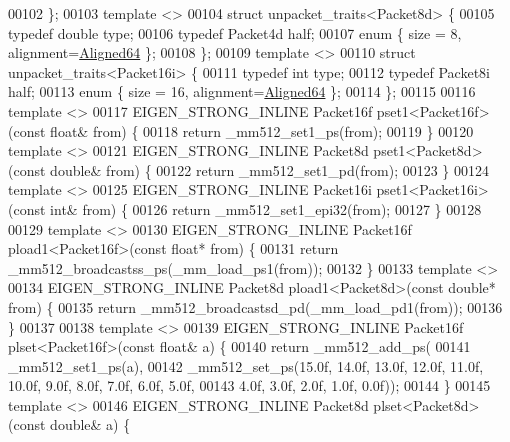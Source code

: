 \begin{DoxyCode}
00102 \};
00103 \textcolor{keyword}{template} <>
00104 \textcolor{keyword}{struct }unpacket\_traits<Packet8d> \{
00105   \textcolor{keyword}{typedef} \textcolor{keywordtype}{double} type;
00106   \textcolor{keyword}{typedef} Packet4d half;
00107   \textcolor{keyword}{enum} \{ size = 8, alignment=\hyperlink{group__enums_gga45fe06e29902b7a2773de05ba27b47a1a0f4f4451618a2e67cade6b54ca0fc84b}{Aligned64} \};
00108 \};
00109 \textcolor{keyword}{template} <>
00110 \textcolor{keyword}{struct }unpacket\_traits<Packet16i> \{
00111   \textcolor{keyword}{typedef} \textcolor{keywordtype}{int} type;
00112   \textcolor{keyword}{typedef} Packet8i half;
00113   \textcolor{keyword}{enum} \{ size = 16, alignment=\hyperlink{group__enums_gga45fe06e29902b7a2773de05ba27b47a1a0f4f4451618a2e67cade6b54ca0fc84b}{Aligned64} \};
00114 \};
00115 
00116 \textcolor{keyword}{template} <>
00117 EIGEN\_STRONG\_INLINE Packet16f pset1<Packet16f>(\textcolor{keyword}{const} \textcolor{keywordtype}{float}& from) \{
00118   \textcolor{keywordflow}{return} \_mm512\_set1\_ps(from);
00119 \}
00120 \textcolor{keyword}{template} <>
00121 EIGEN\_STRONG\_INLINE Packet8d pset1<Packet8d>(\textcolor{keyword}{const} \textcolor{keywordtype}{double}& from) \{
00122   \textcolor{keywordflow}{return} \_mm512\_set1\_pd(from);
00123 \}
00124 \textcolor{keyword}{template} <>
00125 EIGEN\_STRONG\_INLINE Packet16i pset1<Packet16i>(\textcolor{keyword}{const} \textcolor{keywordtype}{int}& from) \{
00126   \textcolor{keywordflow}{return} \_mm512\_set1\_epi32(from);
00127 \}
00128 
00129 \textcolor{keyword}{template} <>
00130 EIGEN\_STRONG\_INLINE Packet16f pload1<Packet16f>(\textcolor{keyword}{const} \textcolor{keywordtype}{float}* from) \{
00131   \textcolor{keywordflow}{return} \_mm512\_broadcastss\_ps(\_mm\_load\_ps1(from));
00132 \}
00133 \textcolor{keyword}{template} <>
00134 EIGEN\_STRONG\_INLINE Packet8d pload1<Packet8d>(\textcolor{keyword}{const} \textcolor{keywordtype}{double}* from) \{
00135   \textcolor{keywordflow}{return} \_mm512\_broadcastsd\_pd(\_mm\_load\_pd1(from));
00136 \}
00137 
00138 \textcolor{keyword}{template} <>
00139 EIGEN\_STRONG\_INLINE Packet16f plset<Packet16f>(\textcolor{keyword}{const} \textcolor{keywordtype}{float}& a) \{
00140   \textcolor{keywordflow}{return} \_mm512\_add\_ps(
00141       \_mm512\_set1\_ps(a),
00142       \_mm512\_set\_ps(15.0f, 14.0f, 13.0f, 12.0f, 11.0f, 10.0f, 9.0f, 8.0f, 7.0f, 6.0f, 5.0f,
00143                     4.0f, 3.0f, 2.0f, 1.0f, 0.0f));
00144 \}
00145 \textcolor{keyword}{template} <>
00146 EIGEN\_STRONG\_INLINE Packet8d plset<Packet8d>(\textcolor{keyword}{const} \textcolor{keywordtype}{double}& a) \{

\end{DoxyCode}
